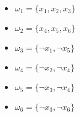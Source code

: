 \begin{minipage}[c]{0.23\linewidth}
           \footnotesize
		\begin{itemize}
			\item[] $\omega_1 = \{x_1, x_2, x_3\}$ 
			\item[] $\omega_2 = \{x_4, x_5, x_6\}$
			\item[] $\omega_3 = \{\neg x_1, \neg x_5\}$
			\item[] $\omega_4 = \{\neg x_2, \neg x_4\}$
			\item[] $\omega_5 = \{\neg x_3, \neg x_4\}$
			\item[] $\omega_6 = \{\neg x_3, \neg x_6\}$
		\end{itemize}
\end{minipage}
